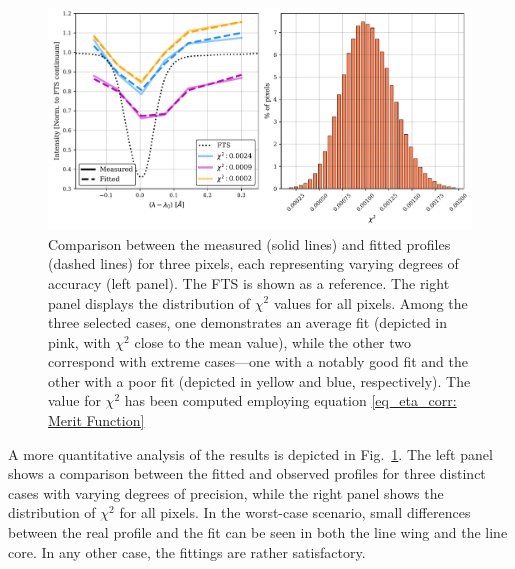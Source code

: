 \begin{figure}[t]
  \centering
  \includegraphics[width=\textwidth]{figures/EtalonPaper/fitting_chisq_hor.pdf}
  \caption[Fitting accuracy.]{Comparison between the measured (solid lines) and fitted profiles (dashed lines) for three pixels, each representing varying degrees of accuracy (left panel). The FTS is shown as a reference. The right panel displays the distribution of $\chi^2$ values for all pixels. Among the three selected cases, one demonstrates an average fit (depicted in pink, with $\chi^2$ close to the mean value), while the other two correspond with extreme cases—one with a notably good fit and the other with a poor fit (depicted in yellow and blue, respectively). The value for $\chi ^2$ has been computed employing equation \eqref{eq_eta_corr: Merit Function}\label{fig_etalon_corr: xisq_hrt}}  
\end{figure}

A more quantitative analysis of the results is depicted in Fig.~\ref{fig_etalon_corr: xisq_hrt}. The left panel shows a comparison between the fitted and observed profiles for three distinct cases with varying degrees of precision, while the right panel shows the distribution of $\chi^2$ for all pixels. In the worst-case scenario, small differences between the real profile and the fit can be seen in both the line wing and the line core. In any other case, the fittings are rather satisfactory.